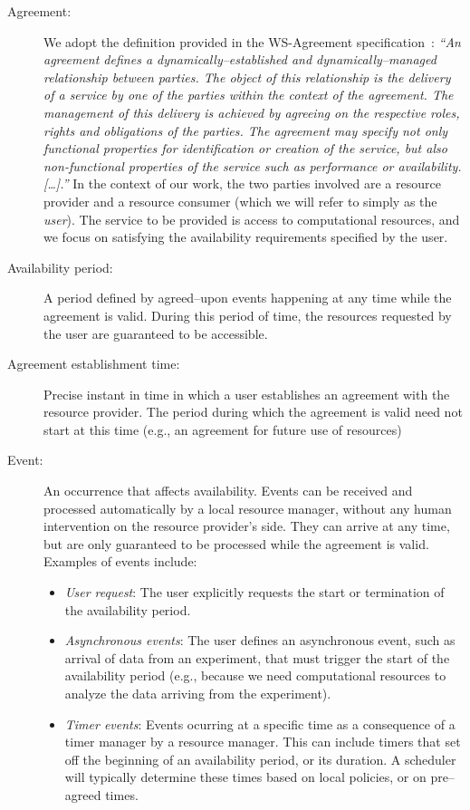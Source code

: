 \begin{description}
\item[Agreement:]  We adopt the definition provided in the WS-Agreement specification~\cite{wsag}: \emph{``An agreement defines a dynamically--established and dynamically--managed relationship between parties. The object of this relationship is the delivery
of a service by one of the parties within the context of the agreement. The management of this delivery is achieved by agreeing on the respective roles, rights and obligations of the parties. The agreement may specify not only functional properties for identification or creation of the service, but also non-functional properties of the service such as performance or availability. [\ldots].''} In the context of our work, the two parties involved are a resource provider and a resource consumer (which we will refer to simply as the \emph{user}). The service to be provided is access to computational resources, and we focus on satisfying the availability requirements specified by the user.
\item[Availability period:] A period defined by agreed--upon events happening at any time while the agreement is valid. During this period of time, the resources requested by the user are guaranteed to be accessible.
\item[Agreement establishment time:] Precise instant in time in which a user establishes an agreement with the resource provider. The period during which the agreement is valid need not start at this time (e.g., an agreement for future use of resources)
\item[Event:] An occurrence that affects availability. Events can be received and processed automatically by a local resource manager, without any human intervention on the resource provider's side. They can arrive at any time, but are only guaranteed to be processed while the agreement is valid. Examples of events include:
\begin{itemize}
\item \emph{User request}: The user explicitly requests the start or termination of the availability period.
\item \emph{Asynchronous events}: The user defines an asynchronous event, such as arrival of data from an experiment, that must trigger the start of the availability period (e.g., because we need computational resources to analyze the data arriving from the experiment).
\item \emph{Timer events}: Events ocurring at a specific time as a consequence of a timer manager by a resource manager. This can include timers that set off the beginning of an availability period, or its duration. A scheduler will typically determine these times based on local policies, or on pre--agreed times.
\end{itemize}
\end{description}


